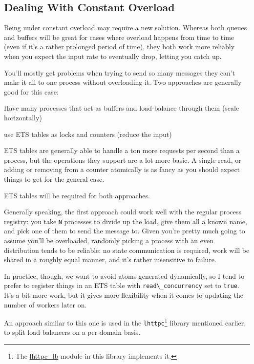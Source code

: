 \documentclass[11pt, oneside]{book}   	%
\newcommand{\module}[1]{\Verb`#1`}
\newcommand{\expression}[1]{\Verb`#1`}
\newcommand{\var}[1]{\Verb`#1`}
\begin{document}
\subsection{Dealing With Constant Overload}

Being under constant overload may require a new solution. Whereas both queues and buffers will be great for cases where overload happens from time to time (even if it's a rather prolonged period of time), they both work more reliably when you expect the input rate to eventually drop, letting you catch up.

You'll mostly get problems when trying to send so many messages they can't make it all to one process without overloading it. Two approaches are generally good for this case:

\begin{itemize*}
	\item Have many processes that act as buffers and load-balance through them (scale horizontally)
	\item use ETS tables as locks and counters (reduce the input)
\end{itemize*}

ETS tables are generally able to handle a ton more requests per second than a process, but the operations they support are a lot more basic. A single read, or adding or removing from a counter atomically is as fancy as you should expect things to get for the general case.

ETS tables will be required for both approaches.

Generally speaking, the first approach could work well with the regular process registry: you take \var{N} processes to divide up the load, give them all a known name, and pick one of them to send the message to. Given you're pretty much going to assume you'll be overloaded, randomly picking a process with an even distribution tends to be reliable: no state communication is required, work will be shared in a roughly equal manner, and it's rather insensitive to failure.

In practice, though, we want to avoid atoms generated dynamically, so I tend to prefer to register things in an ETS table with \expression{read\_concurrency} set to \expression{true}. It's a bit more work, but it gives more flexibility when it comes to updating the number of workers later on.

An approach similar to this one is used in the \module{lhttpc}\footnote{The \href{https://github.com/ferd/lhttpc/blob/master/src/lhttpc\_lb.erl}{lhttpc\_lb} module in this library implements it.} library mentioned earlier, to split load balancers on a per-domain basis.
\end{document}
